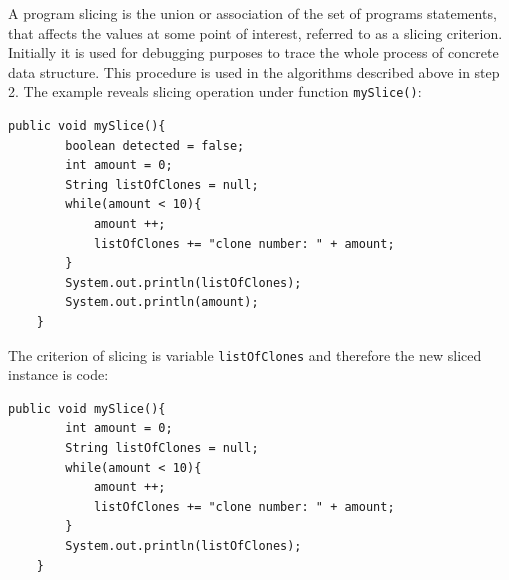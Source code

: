 \documentclass{report}
\begin{document}
A program slicing is the union or association of the set of programs statements, that affects the values at some point of interest, referred to as a slicing criterion. Initially it is used for debugging purposes to trace the whole process of concrete data structure. This procedure is used 
in the algorithms described above in step 2. The example reveals slicing operation under function \texttt{mySlice()}:
\begin{lstlisting}
public void mySlice(){
		boolean detected = false;
		int amount = 0;
		String listOfClones = null;
		while(amount < 10){
			amount ++;
			listOfClones += "clone number: " + amount; 
		}
		System.out.println(listOfClones);
		System.out.println(amount);
	}
\end{lstlisting}
The criterion of slicing is variable \texttt{listOfClones} and therefore the new sliced instance is code:
\begin{lstlisting}
public void mySlice(){
		int amount = 0;
		String listOfClones = null;
		while(amount < 10){
			amount ++;
			listOfClones += "clone number: " + amount; 
		}
		System.out.println(listOfClones);
	}
\end{lstlisting}
\end{document}
